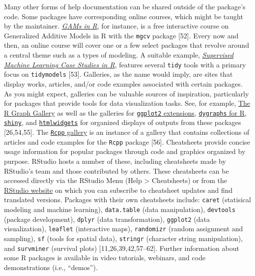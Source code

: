 \documentclass[10pt,letterpaper]{article}
\begin{document}
Many other forms of help documentation can be shared outside of the
package's code. Some packages have corresponding online courses, which
might be taught by the maintainer.
\href{https://noamross.github.io/gams-in-r-course/}{\emph{GAMs in R}},
for instance, is a free interactive course on Generalized Additive
Models in R with the \texttt{mgcv} package {[}52{]}. Every now and then,
an online course will cover one or a few select packages that revolve
around a central theme such as a types of modeling. A suitable example,
\href{https://supervised-ml-course.netlify.app/}{\emph{Supervised
Machine Learning Case Studies in R}}, features several \texttt{tidy}
tools with a primary focus on \texttt{tidymodels} {[}53{]}. Galleries,
as the name would imply, are sites that display works, articles, and/or
code examples associated with certain packages. As you might expect,
galleries can be valuable sources of inspiration, particularly for
packages that provide tools for data visualization tasks. See, for
example, \href{https://www.r-graph-gallery.com/}{The R Graph Gallery} as
well as the galleries for
\href{https://exts.ggplot2.tidyverse.org/gallery/}{\texttt{ggplot2}
extensions},
\href{https://rstudio.github.io/dygraphs/index.html}{\texttt{dygraphs}
for R}, \href{https://shiny.rstudio.com/gallery/}{\texttt{shiny}}, and
\href{https://gallery.htmlwidgets.org/}{\texttt{htmlwidgets}} for
organized displays of outputs from these packages {[}26,54,55{]}. The
\href{https://gallery.rcpp.org/}{\texttt{Rcpp} gallery} is an instance
of a gallery that contains collections of articles and code examples for
the \texttt{Rcpp} package {[}56{]}. Cheatsheets provide concise usage
information for popular packages through code and graphics organized by
purpose. RStudio hosts a number of these, including cheatsheets made by
RStudio's team and those contributed by others. These cheatsheets can be
accessed directly via the RStudio Menu (Help \textgreater{} Cheatsheets)
or from the \href{https://rstudio.com/resources/cheatsheets/}{RStudio
website} on which you can subscribe to cheatsheet updates and find
translated versions. Packages with their own cheatsheets include:
\texttt{caret} (statisical modeling and machine learning),
\texttt{data.table} (data manipulation), \texttt{devtools} (package
development), \texttt{dplyr} (data transformation), \texttt{ggplot2}
(data visualization), \texttt{leaflet} (interactive maps),
\texttt{randomizr} (random assignment and sampling), \texttt{sf} (tools
for spatial data), \texttt{stringr} (character string manipulation), and
\texttt{survminer} (survival plots) {[}11,26,39,42,57--62{]}. Further
information about some R packages is available in video tutorials,
webinars, and code demonstrations (i.e., ``demos'').
\end{document}
